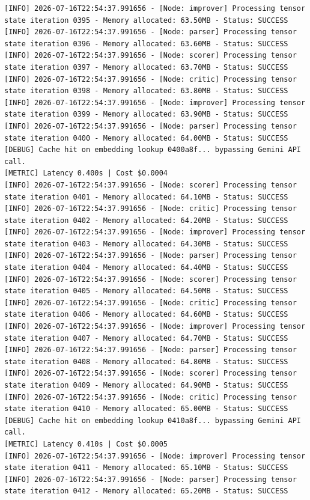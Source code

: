 \documentclass[10pt,journal,compsoc]{IEEEtran}
\begin{document}
\begin{verbatim}
[INFO] 2026-07-16T22:54:37.991656 - [Node: improver] Processing tensor state iteration 0395 - Memory allocated: 63.50MB - Status: SUCCESS
[INFO] 2026-07-16T22:54:37.991656 - [Node: parser] Processing tensor state iteration 0396 - Memory allocated: 63.60MB - Status: SUCCESS
[INFO] 2026-07-16T22:54:37.991656 - [Node: scorer] Processing tensor state iteration 0397 - Memory allocated: 63.70MB - Status: SUCCESS
[INFO] 2026-07-16T22:54:37.991656 - [Node: critic] Processing tensor state iteration 0398 - Memory allocated: 63.80MB - Status: SUCCESS
[INFO] 2026-07-16T22:54:37.991656 - [Node: improver] Processing tensor state iteration 0399 - Memory allocated: 63.90MB - Status: SUCCESS
[INFO] 2026-07-16T22:54:37.991656 - [Node: parser] Processing tensor state iteration 0400 - Memory allocated: 64.00MB - Status: SUCCESS
[DEBUG] Cache hit on embedding lookup 0400a8f... bypassing Gemini API call.
[METRIC] Latency 0.400s | Cost $0.0004
[INFO] 2026-07-16T22:54:37.991656 - [Node: scorer] Processing tensor state iteration 0401 - Memory allocated: 64.10MB - Status: SUCCESS
[INFO] 2026-07-16T22:54:37.991656 - [Node: critic] Processing tensor state iteration 0402 - Memory allocated: 64.20MB - Status: SUCCESS
[INFO] 2026-07-16T22:54:37.991656 - [Node: improver] Processing tensor state iteration 0403 - Memory allocated: 64.30MB - Status: SUCCESS
[INFO] 2026-07-16T22:54:37.991656 - [Node: parser] Processing tensor state iteration 0404 - Memory allocated: 64.40MB - Status: SUCCESS
[INFO] 2026-07-16T22:54:37.991656 - [Node: scorer] Processing tensor state iteration 0405 - Memory allocated: 64.50MB - Status: SUCCESS
[INFO] 2026-07-16T22:54:37.991656 - [Node: critic] Processing tensor state iteration 0406 - Memory allocated: 64.60MB - Status: SUCCESS
[INFO] 2026-07-16T22:54:37.991656 - [Node: improver] Processing tensor state iteration 0407 - Memory allocated: 64.70MB - Status: SUCCESS
[INFO] 2026-07-16T22:54:37.991656 - [Node: parser] Processing tensor state iteration 0408 - Memory allocated: 64.80MB - Status: SUCCESS
[INFO] 2026-07-16T22:54:37.991656 - [Node: scorer] Processing tensor state iteration 0409 - Memory allocated: 64.90MB - Status: SUCCESS
[INFO] 2026-07-16T22:54:37.991656 - [Node: critic] Processing tensor state iteration 0410 - Memory allocated: 65.00MB - Status: SUCCESS
[DEBUG] Cache hit on embedding lookup 0410a8f... bypassing Gemini API call.
[METRIC] Latency 0.410s | Cost $0.0005
[INFO] 2026-07-16T22:54:37.991656 - [Node: improver] Processing tensor state iteration 0411 - Memory allocated: 65.10MB - Status: SUCCESS
[INFO] 2026-07-16T22:54:37.991656 - [Node: parser] Processing tensor state iteration 0412 - Memory allocated: 65.20MB - Status: SUCCESS

\end{verbatim}
\end{document}
